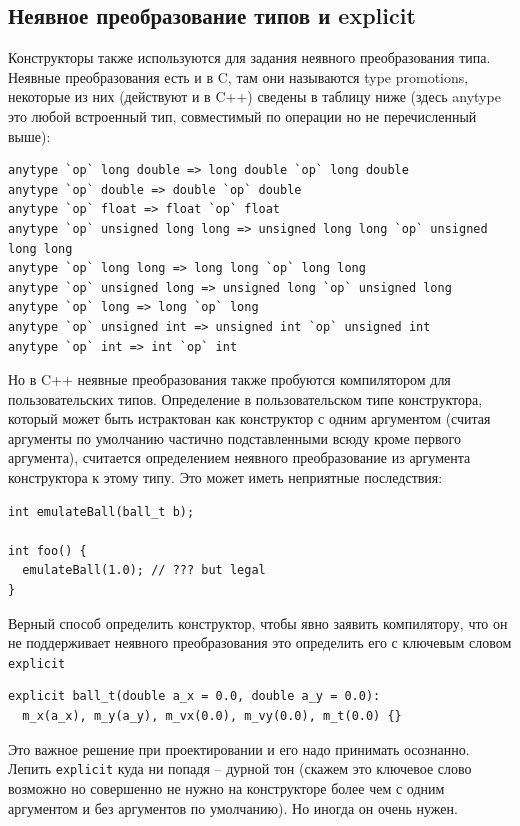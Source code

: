 \documentclass[a4paper,12pt,oneside]{book}
\begin{document}
\subsection{Неявное преобразование типов и explicit}\label{Explicit}

Конструкторы также используются для задания неявного преобразования типа. Неявные преобразования есть и в C, там они называются type promotions, некоторые из них (действуют и в C++) сведены в таблицу ниже (здесь anytype это любой встроенный тип, совместимый по операции но не перечисленный выше):

\begin{lstlisting}
anytype `op` long double => long double `op` long double
anytype `op` double => double `op` double
anytype `op` float => float `op` float
anytype `op` unsigned long long => unsigned long long `op` unsigned long long
anytype `op` long long => long long `op` long long
anytype `op` unsigned long => unsigned long `op` unsigned long
anytype `op` long => long `op` long
anytype `op` unsigned int => unsigned int `op` unsigned int
anytype `op` int => int `op` int
\end{lstlisting}

Но в C++ неявные преобразования также пробуются компилятором для пользовательских типов. Определение в пользовательском типе конструктора, который может быть истрактован как конструктор с одним аргументом (считая аргументы по умолчанию частично подставленными всюду кроме первого аргумента), считается определением неявного преобразование из аргумента конструктора к этому типу. Это может иметь неприятные последствия:

\begin{lstlisting}
int emulateBall(ball_t b);

int foo() {
  emulateBall(1.0); // ??? but legal
}
\end{lstlisting}

Верный способ определить конструктор, чтобы явно заявить компилятору, что он не поддерживает неявного преобразования это определить его с ключевым словом \lstinline!explicit!

\begin{lstlisting}
explicit ball_t(double a_x = 0.0, double a_y = 0.0):
  m_x(a_x), m_y(a_y), m_vx(0.0), m_vy(0.0), m_t(0.0) {}
\end{lstlisting}

Это важное решение при проектировании и его надо принимать осознанно. Лепить \lstinline!explicit! куда ни попадя -- дурной тон (скажем это ключевое слово возможно но совершенно не нужно на конструкторе более чем с одним аргументом и без аргументов по умолчанию). Но иногда он очень нужен.
\end{document}
